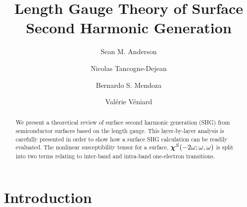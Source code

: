 \documentclass[floatfix,prb,aps,superscriptaddress,11pt,preprint,letterpaper]{revtex4}
\def\chon{black}
\begin{document}
\title{Length Gauge Theory of Surface Second Harmonic Generation}
\author{Sean M. Anderson}
\author{Nicolas Tancogne-Dejean}
\author{Bernardo S. Mendoza}
\author{Val\'erie V\'eniard}

\begin{abstract}
We present a theoretical review of surface second harmonic generation (SHG) 
from semiconductor surfaces based on the {\color{\chon} length} gauge. This 
layer-by-layer analysis is carefully presented in order to show how a 
surface SHG calculation can be readily evaluated. The nonlinear susceptibility 
tensor for a surface, $\boldsymbol{\chi}^S(-2\omega;\omega,\omega)$
is split into two terms relating to inter-band 
and intra-band one-electron transitions. 

\end{abstract}  

\maketitle

\section{Introduction}\label{intro}
\end{document}
